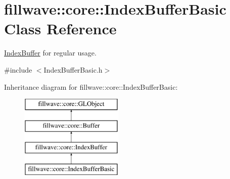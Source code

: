 \hypertarget{classfillwave_1_1core_1_1IndexBufferBasic}{}\section{fillwave\+:\+:core\+:\+:Index\+Buffer\+Basic Class Reference}
\label{classfillwave_1_1core_1_1IndexBufferBasic}


\hyperlink{classfillwave_1_1core_1_1IndexBuffer}{Index\+Buffer} for regular usage.  




{\ttfamily \#include $<$Index\+Buffer\+Basic.\+h$>$}

Inheritance diagram for fillwave\+:\+:core\+:\+:Index\+Buffer\+Basic\+:\begin{figure}[H]
\begin{center}
\leavevmode
\includegraphics[height=4.000000cm]{classfillwave_1_1core_1_1IndexBufferBasic}
\end{center}
\end{figure}
